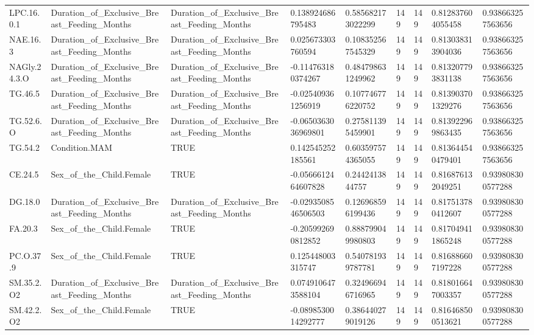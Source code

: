 \begin{longtable}{lllllllll}
LPC.16.0.1 & Duration\_of\_Exclusive\_Breast\_Feeding\_Months & Duration\_of\_Exclusive\_Breast\_Feeding\_Months & 0.138924686795483 & 0.585682173022299 & 149 & 149 & 0.812837604055458 & 0.938663257563656 \\
NAE.16.3 & Duration\_of\_Exclusive\_Breast\_Feeding\_Months & Duration\_of\_Exclusive\_Breast\_Feeding\_Months & 0.025673303760594 & 0.108352567545329 & 149 & 149 & 0.813038313904036 & 0.938663257563656 \\
NAGly.24.3.O & Duration\_of\_Exclusive\_Breast\_Feeding\_Months & Duration\_of\_Exclusive\_Breast\_Feeding\_Months & -0.114763180374267 & 0.484798631249962 & 149 & 149 & 0.813207793831138 & 0.938663257563656 \\
TG.46.5 & Duration\_of\_Exclusive\_Breast\_Feeding\_Months & Duration\_of\_Exclusive\_Breast\_Feeding\_Months & -0.025409361256919 & 0.107746776220752 & 149 & 149 & 0.813903701329276 & 0.938663257563656 \\
TG.52.6.O & Duration\_of\_Exclusive\_Breast\_Feeding\_Months & Duration\_of\_Exclusive\_Breast\_Feeding\_Months & -0.0650363036969801 & 0.275811395459901 & 149 & 149 & 0.813922969863435 & 0.938663257563656 \\
TG.54.2 & Condition.MAM & TRUE & 0.142545252185561 & 0.603597574365055 & 149 & 149 & 0.813644540479401 & 0.938663257563656 \\
CE.24.5 & Sex\_of\_the\_Child.Female & TRUE & -0.0566612464607828 & 0.2442413844757 & 149 & 149 & 0.816876132049251 & 0.939808300577288 \\
DG.18.0 & Duration\_of\_Exclusive\_Breast\_Feeding\_Months & Duration\_of\_Exclusive\_Breast\_Feeding\_Months & -0.0293508546506503 & 0.126968596199436 & 149 & 149 & 0.817513780412607 & 0.939808300577288 \\
FA.20.3 & Sex\_of\_the\_Child.Female & TRUE & -0.205992690812852 & 0.888799049980803 & 149 & 149 & 0.817049411865248 & 0.939808300577288 \\
PC.O.37.9 & Sex\_of\_the\_Child.Female & TRUE & 0.125448003315747 & 0.540781939787781 & 149 & 149 & 0.816886607197228 & 0.939808300577288 \\
SM.35.2.O2 & Duration\_of\_Exclusive\_Breast\_Feeding\_Months & Duration\_of\_Exclusive\_Breast\_Feeding\_Months & 0.0749106473588104 & 0.324966946716965 & 149 & 149 & 0.818016647003357 & 0.939808300577288 \\
SM.42.2.O2 & Sex\_of\_the\_Child.Female & TRUE & -0.0898530014292777 & 0.386440279019126 & 149 & 149 & 0.816468500513621 & 0.939808300577288 \\

\end{longtable}
